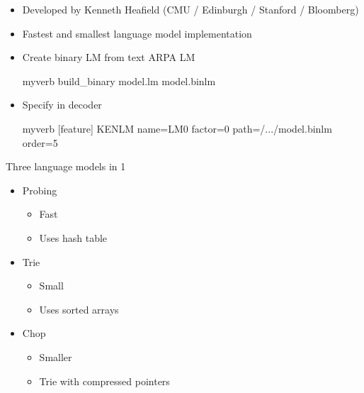 \documentclass[landscape]{uedslides2C}
\begin{document}
\vspace{10mm}
\begin{itemize}
\item Developed by Kenneth Heafield (CMU / Edinburgh / Stanford / Bloomberg)
\item Fastest and smallest language model implementation
\item Create binary LM from text ARPA LM\\[5mm]
\begin{SaveVerbatim}{myverb} 
build_binary model.lm model.binlm
\end{SaveVerbatim}
\colorbox{gray}{}
\item Specify in decoder\\[5mm]
\begin{SaveVerbatim}{myverb} 
[feature]
KENLM name=LM0 factor=0 path=/.../model.binlm order=5
\end{SaveVerbatim}
\colorbox{gray}{}
\end{itemize}



Three language models in 1
\begin{itemize}
\item Probing
  \begin{itemize}
  \item Fast
  \item Uses hash table
  \end{itemize}
\item Trie
  \begin{itemize}
  \item Small
  \item Uses sorted arrays
  \end{itemize}
\item Chop
  \begin{itemize}
  \item Smaller
  \item Trie with compressed pointers
  \end{itemize}
\end{itemize}


\end{document}
